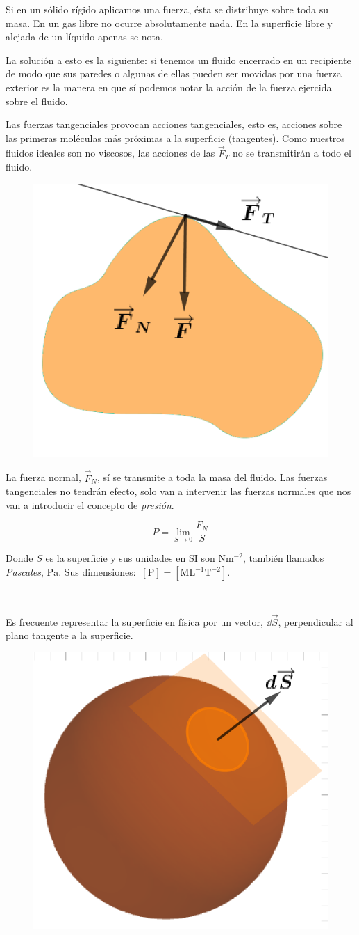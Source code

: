 Si en un sólido rígido aplicamos una fuerza, ésta se distribuye sobre toda su masa. En un gas libre no ocurre absolutamente nada. En la superficie libre y alejada de un líquido apenas se nota.

La solución a esto es la siguiente: si tenemos un fluido encerrado en un recipiente de modo que sus paredes o algunas de ellas pueden ser movidas por una fuerza exterior es la manera en que sí podemos notar la acción de la fuerza ejercida sobre el fluido.

\begin{multicols}{2}
Las fuerzas tangenciales provocan acciones tangenciales, esto es, acciones sobre las primeras moléculas más próximas a la superficie (tangentes). Como nuestros fluidos ideales son no viscosos, las acciones de las $\overrightarrow{F}_T$ no se transmitirán a todo el fluido.
\begin{figure}[H]
	\centering
	\includegraphics[width=.4\textwidth]{imagenes/imagenes07/T07IM01.png}
\end{figure}
\end{multicols}
La fuerza normal, $\overrightarrow{F}_N$, sí se transmite a toda la masa del fluido. Las fuerzas tangenciales no tendrán efecto, solo van a intervenir las fuerzas normales que nos van a introducir el concepto de \emph{presión}.

\begin{equation}
P=\lim_{S\to 0} \dfrac {F_N}{S}	
\end{equation}

Donde $S$ es la superficie y sus unidades en SI son $\mathrm{Nm^{-2}}$, también llamados \emph{Pascales}, $\mathrm{Pa}$. Sus dimensiones: $\ [\mathrm{P}]=[\mathrm{ML}^{-1}\mathrm{T}^{-2}]$.



\begin{multicols}{2}
$\quad$

Es frecuente representar la superficie en física por un vector, $\dd \overrightarrow{S}$, perpendicular al plano tangente a la superficie.
\begin{figure}[H]
	\centering
	\includegraphics[width=.3\textwidth]{imagenes/imagenes07/T07IM02.png}
\end{figure}
\end{multicols}

